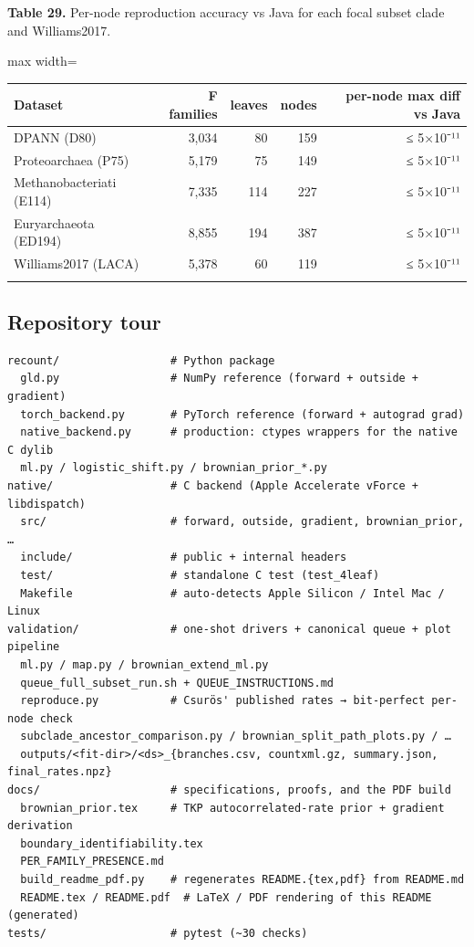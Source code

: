 \documentclass[
  10pt,
]{article}
\begin{document}
\textbf{Table 29.} Per-node reproduction accuracy vs Java for each focal
subset clade and Williams2017.

\begin{center}
\begin{adjustbox}{max width=\textwidth}
\begin{tabular}{@{}lrrrr@{}}
\toprule\noalign{}
Dataset & F families & leaves & nodes & per-node max diff vs Java \\
\midrule\noalign{}
DPANN (D80) & 3,034 & 80 & 159 & ≤ 5×10⁻¹¹ \\
Proteoarchaea (P75) & 5,179 & 75 & 149 & ≤ 5×10⁻¹¹ \\
Methanobacteriati (E114) & 7,335 & 114 & 227 & ≤ 5×10⁻¹¹ \\
Euryarchaeota (ED194) & 8,855 & 194 & 387 & ≤ 5×10⁻¹¹ \\
Williams2017 (LACA) & 5,378 & 60 & 119 & ≤ 5×10⁻¹¹ \\
\bottomrule\noalign{}
\end{tabular}
\end{adjustbox}
\end{center}

\subsection{Repository tour}\label{repository-tour}

\begin{verbatim}
recount/                 # Python package
  gld.py                 # NumPy reference (forward + outside + gradient)
  torch_backend.py       # PyTorch reference (forward + autograd grad)
  native_backend.py      # production: ctypes wrappers for the native C dylib
  ml.py / logistic_shift.py / brownian_prior_*.py
native/                  # C backend (Apple Accelerate vForce + libdispatch)
  src/                   # forward, outside, gradient, brownian_prior, …
  include/               # public + internal headers
  test/                  # standalone C test (test_4leaf)
  Makefile               # auto-detects Apple Silicon / Intel Mac / Linux
validation/              # one-shot drivers + canonical queue + plot pipeline
  ml.py / map.py / brownian_extend_ml.py
  queue_full_subset_run.sh + QUEUE_INSTRUCTIONS.md
  reproduce.py           # Csurös' published rates → bit-perfect per-node check
  subclade_ancestor_comparison.py / brownian_split_path_plots.py / …
  outputs/<fit-dir>/<ds>_{branches.csv, countxml.gz, summary.json, final_rates.npz}
docs/                    # specifications, proofs, and the PDF build
  brownian_prior.tex     # TKP autocorrelated-rate prior + gradient derivation
  boundary_identifiability.tex
  PER_FAMILY_PRESENCE.md
  build_readme_pdf.py    # regenerates README.{tex,pdf} from README.md
  README.tex / README.pdf  # LaTeX / PDF rendering of this README (generated)
tests/                   # pytest (~30 checks)
\end{verbatim}
\end{document}
